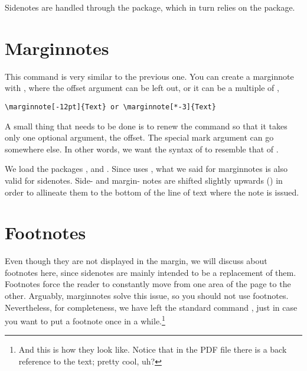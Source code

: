 Sidenotes are handled through the  package, which in 
turn relies on the  package.

\section{Marginnotes}

This command is very similar to the previous one. You can create a 
marginnote with , where the offset 
argument can be left out, or it can be a multiple of 
, 
\eg

\begin{lstlisting}[style=kaolstplain]
\marginnote[-12pt]{Text} or \marginnote[*-3]{Text}
\end{lstlisting}

\begin{kaobox}[frametitle=To Do]
A small thing that needs to be done is to renew the  
command so that it takes only one optional argument, the offset. The 
special mark argument can go somewhere else. In other words, we want the 
syntax of  to resemble that of .
\end{kaobox}

We load the packages ,  and 
. Since  uses , 
what we said for marginnotes is also valid for sidenotes. Side- and 
margin- notes are shifted slightly upwards 
() in 
order to allineate them to the bottom of the line of text where the note 
is issued.

\section{Footnotes}

Even though they are not displayed in the margin, we will discuss about 
footnotes here, since sidenotes are mainly intended to be a replacement 
of them. Footnotes force the reader to constantly move from one area of 
the page to the other. Arguably, marginnotes solve this issue, so you 
should not use footnotes. Nevertheless, for completeness, we have left 
the standard command , just in case you want to put a 
footnote once in a while.\footnote{And this is how they look like. 
Notice that in the PDF file there is a back reference to the text; 
pretty cool, uh?}

